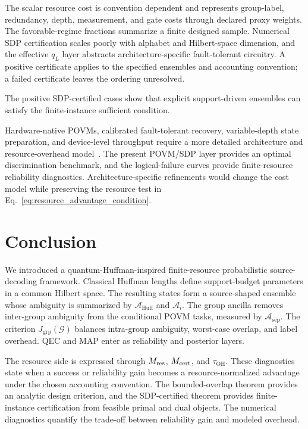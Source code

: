 \documentclass[
 reprint,
 amsmath,amssymb,
 aps,
 pra,
 floatfix,
]{revtex4-2}
\begin{document}
The scalar resource cost is convention dependent and represents group-label, redundancy, depth, measurement, and gate costs through declared proxy weights. The favorable-regime fractions summarize a finite designed sample. Numerical SDP certification scales poorly with alphabet and Hilbert-space dimension, and the effective $q_L$ layer abstracts architecture-specific fault-tolerant circuitry. A positive certificate applies to the specified ensembles and accounting convention; a failed certificate leaves the ordering unresolved.

The positive SDP-certified cases show that explicit support-driven ensembles can satisfy the finite-instance sufficient condition.

Hardware-native POVMs, calibrated fault-tolerant recovery, variable-depth state preparation, and device-level throughput require a more detailed architecture and resource-overhead model~\cite{fowler2012surface,terhal2015quantum,campbell2017roads}. The present POVM/SDP layer provides an optimal discrimination benchmark, and the logical-failure curves provide finite-resource reliability diagnostics. Architecture-specific refinements would change the cost model while preserving the resource test in Eq.~\eqref{eq:resource_advantage_condition}.

\section{Conclusion}

We introduced a quantum-Huffman-inspired finite-resource probabilistic source-decoding framework. Classical Huffman lengths define support-budget parameters in a common Hilbert space. The resulting states form a source-shaped ensemble whose ambiguity is summarized by \(\mathcal A_{\mathrm{Huff}}\) and \(\mathcal A_i\). The group ancilla removes inter-group ambiguity from the conditional POVM tasks, measured by \(\mathcal A_{\mathrm{sep}}\). The criterion \(J_{\mathrm{grp}}(\mathcal G)\) balances intra-group ambiguity, worst-case overlap, and label overhead. QEC and MAP enter as reliability and posterior layers.

The resource side is expressed through \(M_{\rm res}\), \(M_{\rm cert}\), and \(\tau_{\mathrm{OH}}\). These diagnostics state when a success or reliability gain becomes a resource-normalized advantage under the chosen accounting convention. The bounded-overlap theorem provides an analytic design criterion, and the SDP-certified theorem provides finite-instance certification from feasible primal and dual objects. The numerical diagnostics quantify the trade-off between reliability gain and modeled overhead.
\end{document}
